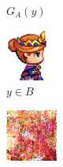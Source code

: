 \documentclass[twocolumn,11pt]{ctexart}
\begin{document}
\begin{figure}[htb]
\begin{subfigure}[b]{0.23\linewidth}
        \caption{$G_A(y)$}
      \end{subfigure}
      \begin{subfigure}[b]{0.23\linewidth}
        \includegraphics[width=\linewidth]{exp3_epoch194_real_B.png}
        \caption{$y \in B$}
      \end{subfigure}
      \begin{subfigure}[b]{0.23\linewidth}
        \includegraphics[width=\linewidth]{exp3_epoch194_fake_A.png}

\end{subfigure}
\end{figure}
\end{document}
